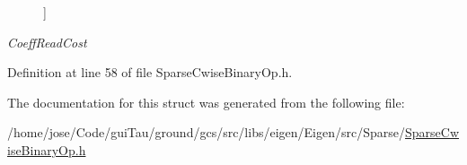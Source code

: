 \begin{Desc}
\begin{description}
{}]\item[{\em 
\hypertarget{structei__traits_3_01_sparse_cwise_binary_op_3_01_binary_op_00_01_lhs_00_01_rhs_01_4_01_4_a0c9b41e572ddd81de630b8b29e5689bcabb4f2a4b14b7bc70984b86e05f8d4d41}{Coeff\-Read\-Cost}\label{structei__traits_3_01_sparse_cwise_binary_op_3_01_binary_op_00_01_lhs_00_01_rhs_01_4_01_4_a0c9b41e572ddd81de630b8b29e5689bcabb4f2a4b14b7bc70984b86e05f8d4d41}
}]\end{description}
\end{Desc}


Definition at line 58 of file Sparse\-Cwise\-Binary\-Op.\-h.



The documentation for this struct was generated from the following file\-:\begin{DoxyCompactItemize}
\item 
/home/jose/\-Code/gui\-Tau/ground/gcs/src/libs/eigen/\-Eigen/src/\-Sparse/\hyperlink{_sparse_cwise_binary_op_8h}{Sparse\-Cwise\-Binary\-Op.\-h}\end{DoxyCompactItemize}
